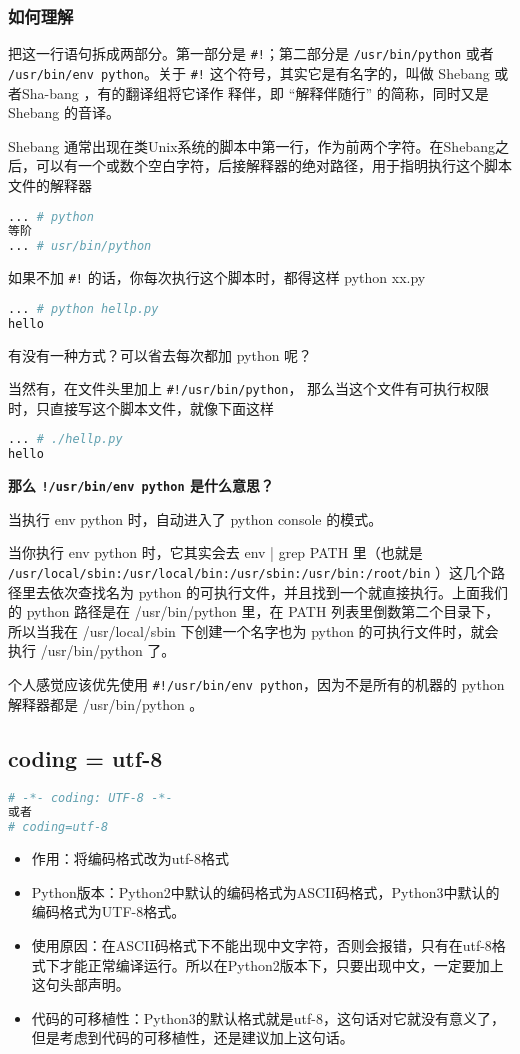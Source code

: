 \subsubsection{如何理解}
把这一行语句拆成两部分。第一部分是 \verb`#!`；第二部分是 \verb`/usr/bin/python` 或者 \verb`/usr/bin/env python`。关于 \verb`#!` 这个符号，其实它是有名字的，叫做 Shebang 或者Sha-bang ，有的翻译组将它译作 释伴，即 “解释伴随行” 的简称，同时又是 Shebang 的音译。

Shebang 通常出现在类Unix系统的脚本中第一行，作为前两个字符。在Shebang之后，可以有一个或数个空白字符，后接解释器的绝对路径，用于指明执行这个脚本文件的解释器
\begin{lstlisting}[language=bash]
... # python
等阶
... # usr/bin/python
\end{lstlisting}

如果不加 \verb`#!` 的话，你每次执行这个脚本时，都得这样 python xx.py
\begin{lstlisting}[language=bash]
... # python hellp.py
hello
\end{lstlisting}

有没有一种方式？可以省去每次都加 python 呢？

当然有，在文件头里加上 \verb`#!/usr/bin/python`， 那么当这个文件有可执行权限 时，只直接写这个脚本文件，就像下面这样
\begin{lstlisting}[language=bash]
... # ./hellp.py
hello
\end{lstlisting}

\textbf{那么 \verb`!/usr/bin/env python` 是什么意思？}

当执行 env python 时，自动进入了 python console 的模式。

当你执行 env python 时，它其实会去 env | grep PATH 里（也就是\verb` /usr/local/sbin:/usr/local/bin:/usr/sbin:/usr/bin:/root/bin` ）这几个路径里去依次查找名为 python 的可执行文件，并且找到一个就直接执行。上面我们的 python 路径是在 /usr/bin/python 里，在 PATH 列表里倒数第二个目录下，所以当我在 /usr/local/sbin 下创建一个名字也为 python 的可执行文件时，就会执行 /usr/bin/python 了。

个人感觉应该优先使用 \verb`#!/usr/bin/env python`，因为不是所有的机器的 python 解释器都是 /usr/bin/python 。

\subsection{coding = utf-8 }
\begin{lstlisting}[language=python]
# -*- coding: UTF-8 -*-
或者
# coding=utf-8
\end{lstlisting}
\begin{itemize}
\item 作用：将编码格式改为utf-8格式
\item Python版本：Python2中默认的编码格式为ASCII码格式，Python3中默认的编码格式为UTF-8格式。
\item 使用原因：在ASCII码格式下不能出现中文字符，否则会报错，只有在utf-8格式下才能正常编译运行。所以在Python2版本下，只要出现中文，一定要加上这句头部声明。
\item 代码的可移植性：Python3的默认格式就是utf-8，这句话对它就没有意义了，但是考虑到代码的可移植性，还是建议加上这句话。
\end{itemize}

